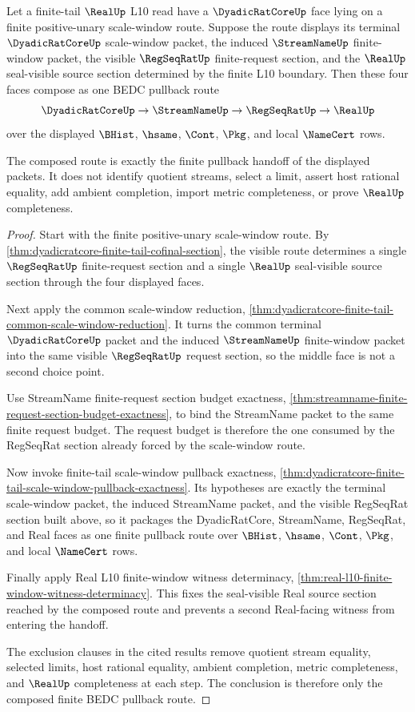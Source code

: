 \begin{theorem}
\label{thm:dyadicratcore-regseqrat-real-pullback-composition}
Let a finite-tail $\RealUp$ L10 read have a $\DyadicRatCoreUp$ face lying on a finite positive-unary scale-window route. Suppose the route displays its terminal $\DyadicRatCoreUp$ scale-window packet, the induced $\StreamNameUp$ finite-window packet, the visible $\RegSeqRatUp$ finite-request section, and the $\RealUp$ seal-visible source section determined by the finite L10 boundary. Then these four faces compose as one BEDC pullback route
$$
\DyadicRatCoreUp \to \StreamNameUp \to \RegSeqRatUp \to \RealUp
$$
over the displayed $\BHist$, $\hsame$, $\Cont$, $\Pkg$, and local $\NameCert$ rows.

The composed route is exactly the finite pullback handoff of the displayed packets. It does not identify quotient streams, select a limit, assert host rational equality, add ambient completion, import metric completeness, or prove $\RealUp$ completeness.
\end{theorem}
\begin{proof}
Start with the finite positive-unary scale-window route. By \autoref{thm:dyadicratcore-finite-tail-cofinal-section}, the visible route determines a single $\RegSeqRatUp$ finite-request section and a single $\RealUp$ seal-visible source section through the four displayed faces.

Next apply the common scale-window reduction, \autoref{thm:dyadicratcore-finite-tail-common-scale-window-reduction}. It turns the common terminal $\DyadicRatCoreUp$ packet and the induced $\StreamNameUp$ finite-window packet into the same visible $\RegSeqRatUp$ request section, so the middle face is not a second choice point.

Use StreamName finite-request section budget exactness, \autoref{thm:streamname-finite-request-section-budget-exactness}, to bind the StreamName packet to the same finite request budget. The request budget is therefore the one consumed by the RegSeqRat section already forced by the scale-window route.

Now invoke finite-tail scale-window pullback exactness, \autoref{thm:dyadicratcore-finite-tail-scale-window-pullback-exactness}. Its hypotheses are exactly the terminal scale-window packet, the induced StreamName packet, and the visible RegSeqRat section built above, so it packages the DyadicRatCore, StreamName, RegSeqRat, and Real faces as one finite pullback route over $\BHist$, $\hsame$, $\Cont$, $\Pkg$, and local $\NameCert$ rows.

Finally apply Real L10 finite-window witness determinacy, \autoref{thm:real-l10-finite-window-witness-determinacy}. This fixes the seal-visible Real source section reached by the composed route and prevents a second Real-facing witness from entering the handoff.

The exclusion clauses in the cited results remove quotient stream equality, selected limits, host rational equality, ambient completion, metric completeness, and $\RealUp$ completeness at each step. The conclusion is therefore only the composed finite BEDC pullback route.
\end{proof}

